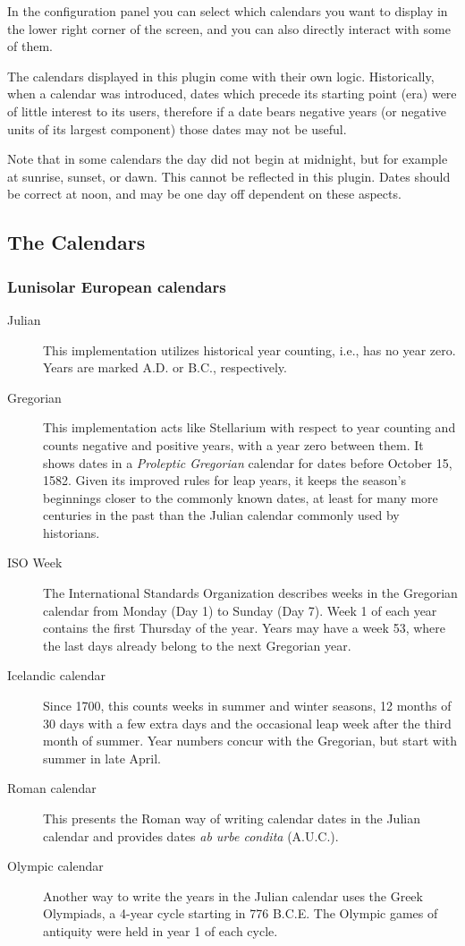 In the configuration panel you can select which calendars you want to
display in the lower right corner of the screen, and you can also directly
interact with some of them.

The calendars displayed in this plugin come with their own
logic. Historically, when a calendar was introduced, dates which
precede its starting point (era) were of little interest to its users,
therefore if a date bears negative years (or negative units of its
largest component) those dates may not be useful.

Note that in some calendars the day did not begin at midnight, but for
example at sunrise, sunset, or dawn. This cannot be reflected in this
plugin. Dates should be correct at noon, and may be one day off
dependent on these aspects.

\subsection{The Calendars}
\subsubsection{Lunisolar European calendars}
\begin{description}
\item[Julian] This implementation utilizes historical year counting,
  i.e., has no year zero. Years are marked A.D. or B.C., respectively.
\item[Gregorian] This implementation acts like Stellarium with respect
  to year counting and counts negative and positive years, with a year
  zero between them. It shows dates in a \emph{Proleptic Gregorian}
  calendar for dates before October 15, 1582. Given its improved rules
  for leap years, it keeps the season's beginnings closer to the
  commonly known dates, at least for many more centuries in the past
  than the Julian calendar commonly used by historians.
\item[ISO Week] The International Standards Organization describes
  weeks in the Gregorian calendar from Monday (Day 1) to Sunday (Day
  7). Week 1 of each year contains the first Thursday of the
  year. Years may have a week 53, where the last days already belong
  to the next Gregorian year.
\item[Icelandic calendar] Since 1700, this counts weeks in summer and
  winter seasons, 12 months of 30 days with a few extra days and the
  occasional leap week after the third month of summer. Year numbers
  concur with the Gregorian, but start with summer in late April.
\item[Roman calendar] This presents the Roman way of writing calendar
  dates in the Julian calendar and provides dates \emph{ab urbe condita} (A.U.C.).
\item[Olympic calendar] Another way to write the years in the Julian
  calendar uses the Greek Olympiads, a 4-year cycle starting in 776
  B.C.E. The Olympic games of antiquity were held in year 1 of each cycle.
\end{description}

